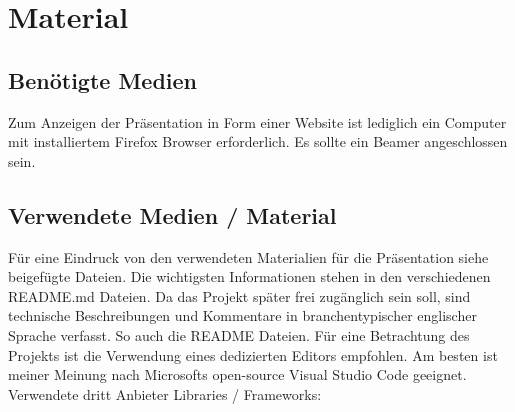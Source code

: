 \documentclass[a4paper, 12pt, oneside]{article}
\begin{document}
    \section{Material}

    \subsection{Benötigte Medien}

    Zum Anzeigen der Präsentation in Form einer Website ist lediglich ein Computer mit 
    installiertem Firefox Browser erforderlich. Es sollte ein Beamer angeschlossen sein.

    \subsection{Verwendete Medien / Material}

    Für eine Eindruck von den verwendeten Materialien für die Präsentation siehe 
    beigefügte Dateien. Die wichtigsten Informationen stehen in den verschiedenen README.md Dateien.
    Da das Projekt später frei zugänglich sein soll, sind technische Beschreibungen und Kommentare 
    in branchentypischer englischer Sprache verfasst. So auch die README Dateien.
    Für eine Betrachtung des Projekts ist die Verwendung eines dedizierten Editors empfohlen.
    Am besten ist meiner Meinung nach Microsofts open-source Visual Studio Code geeignet. \\
    Verwendete dritt Anbieter Libraries / Frameworks:

    \vspace{0.5cm}
\end{document}
